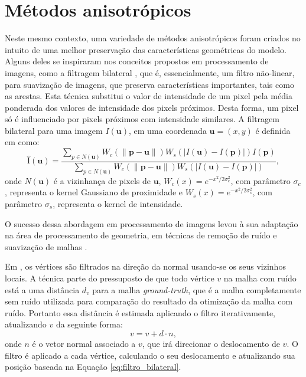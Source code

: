 \section{Métodos anisotrópicos}

Neste mesmo contexto, uma variedade de métodos anisotrópicos foram criados no intuito de uma melhor preservação das características geométricas do modelo. Alguns deles se inspiraram nos conceitos propostos em processamento de imagens, como a filtragem bilateral \cite{tomasi1998bilateral}, que é, essencialmente, um filtro não-linear, para suavização de imagens, que preserva características importantes, tais como as arestas. Esta técnica substitui o valor de intensidade de um pixel pela média ponderada dos valores de intensidade dos pixels próximos. Desta forma, um pixel só é influenciado por pixels próximos com intensidade similares. A filtragem bilateral para uma imagem $I(\mathbf{u})$, em uma coordenada $\mathbf{u} = (x,y)$ é definida em \cite{tomasi1998bilateral} como:
\begin{equation}\label{eq:filtro_bilateral} 
    \hat{\mathrm{I}}(\mathbf{u}) = \frac{\sum_{p \in N(\mathbf{u})}{W_c(\|\mathbf{p}-\mathbf{u}\|)W_s(|I(\mathbf{u})-I(\mathbf{p})|)I(\mathbf{p})}}{ \sum_{p \in N(\mathbf{u})}{W_c(\|\mathbf{p}-\mathbf{u}\|)W_s(|I(\mathbf{u})-I(\mathbf{p})|)} },
\end{equation}
onde $N(\mathbf{u})$ é a vizinhança de pixels de $\mathbf{u}$, $W_c(x) = e^{-x^2/2\sigma_c^2}$, com parâmetro $\sigma_c$, representa o kernel Gaussiano de proximidade e $W_s(x) = e^{-x^2/2\sigma_s^2}$, com parâmetro $\sigma_s$, representa o kernel de intensidade.

O sucesso dessa abordagem em processamento de imagens levou à sua adaptação na área de processamento de geometria, em técnicas de remoção de ruído e suavização de malhas \cite{fleishman2003bilateral, jones2003non, zheng2011bilateral, solomon2014general}.

Em \cite{fleishman2003bilateral}, os vértices são filtrados na direção da normal usando-se os seus vizinhos locais. A técnica parte do pressuposto de que todo vértice $v$ na malha com ruído está a uma distância $d_v$ para a malha \textit{ground-truth}, que é a malha completamente sem ruído utilizada para comparação do resultado da otimização da malha com ruído. Portanto essa distância é estimada aplicando o filtro iterativamente, atualizando $v$ da seguinte forma:
\begin{equation}
    v = v + d \cdot n,
\end{equation}
onde $n$ é o vetor normal associado a $v$, que irá direcionar o deslocamento de $v$. O filtro é aplicado a cada vértice, calculando o seu deslocamento e atualizando sua posição baseada na Equação \ref{eq:filtro_bilateral}.

